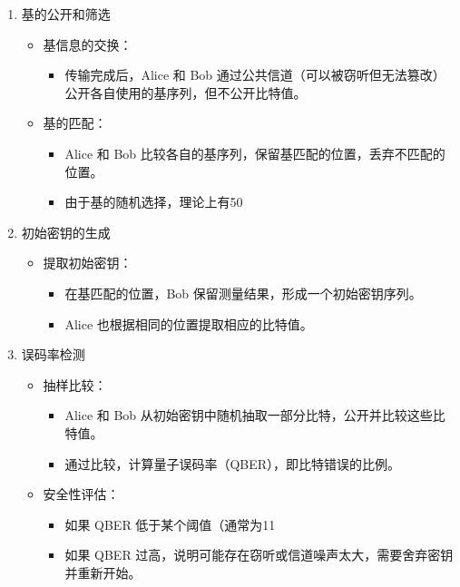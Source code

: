 \begin{itemize}
\begin{enumerate}
		\item 基的公开和筛选
		
		\begin{itemize}
			\item 基信息的交换：
			\begin{itemize}
				\item 传输完成后，Alice 和 Bob 通过公共信道（可以被窃听但无法篡改）公开各自使用的基序列，但不公开比特值。
			\end{itemize}
			
			\item 基的匹配：
			\begin{itemize}
				\item Alice 和 Bob 比较各自的基序列，保留基匹配的位置，丢弃不匹配的位置。
				\item 由于基的随机选择，理论上有50%
			\end{itemize}
		\end{itemize}
		
		\item 初始密钥的生成
		
		\begin{itemize}
			\item 提取初始密钥：
			\begin{itemize}
				\item 在基匹配的位置，Bob 保留测量结果，形成一个初始密钥序列。
				\item Alice 也根据相同的位置提取相应的比特值。
			\end{itemize}
		\end{itemize}
		
		\item 误码率检测
		
		\begin{itemize}
			\item 抽样比较：
			\begin{itemize}
				\item Alice 和 Bob 从初始密钥中随机抽取一部分比特，公开并比较这些比特值。
				\item 通过比较，计算量子误码率（QBER），即比特错误的比例。
			\end{itemize}
			
			\item 安全性评估：
			\begin{itemize}
				\item 如果 QBER 低于某个阈值（通常为11%
				\item 如果 QBER 过高，说明可能存在窃听或信道噪声太大，需要舍弃密钥并重新开始。
			\end{itemize}
		\end{itemize}
		

\end{enumerate}
\end{itemize}
